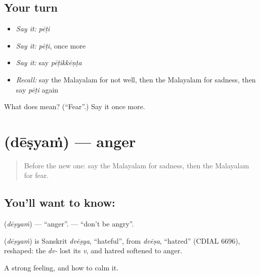 \subsection*{Your turn}
\begin{itemize}
\raggedright
  \item \emph{Say it:} \emph{pēṭi}
  \item \emph{Say it:} \emph{pēṭi}, once more
  \item \emph{Say it:} say \emph{pēṭikkēṇṭa}
  \item \emph{Recall:} say the Malayalam for not well, then the Malayalam for sadness, then say \emph{pēṭi} again
\end{itemize}

\begin{tcolorbox}[breakable,colback=teal!4,colframe=teal!35!black,title={Before you move on}]
What does  mean? (\textquotedblleft{}Fear\textquotedblright{}.) Say it once more.
\end{tcolorbox}
\section[\texorpdfstring{\ml{ദേഷ്യം} (dēṣyaṁ)}{ദേഷ്യം (dēṣyaṁ)}]{ (dēṣyaṁ) — anger}

\label{lesson:ML-C116-anger}



\begin{quote}
Before the new one: say the Malayalam for sadness, then the Malayalam for fear.
\end{quote}

\subsection*{You'll want to know: }
\textbf{} (\emph{dēṣyaṁ}) — \textquotedblleft{}anger\textquotedblright{}. \textbf{} — \textquotedblleft{}don't be angry\textquotedblright{}.

\begin{cousinweb}
\textbf{} (\emph{dēṣyaṁ}) is Sanskrit \emph{dvēṣya}, \textquotedblleft{}hateful\textquotedblright{}, from \emph{dvēṣa}, \textquotedblleft{}hatred\textquotedblright{} (CDIAL 6696), reshaped: the \emph{dv-} lost its \emph{v}, and hatred softened to anger.
\end{cousinweb}

\begin{grammarlens}[title={What you've built}]
A strong feeling, and how to calm it.
\end{grammarlens}

